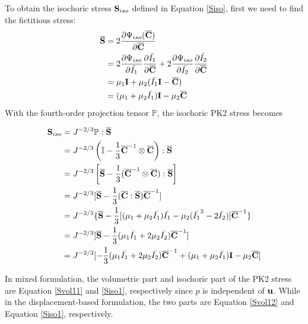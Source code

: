 To obtain the isochoric stress $\bold{S}_{iso}$ defined in Equation \ref{Siso}, first we need to find the fictitious stress:
\begin{equation} \label{Sbar1}
\begin{split}
\overline{\bold{S}} &= 2\frac{\partial\Psi_{iso}({\overline{\bold{C}})}}{\partial\overline{\bold{C}}} \\
&= 2\frac{\partial\Psi_{iso}}{\partial\bar{I_1}} \frac{\partial\bar{I_1}}{\partial\overline{\bold{C}}}  + 2\frac{\partial\Psi_{iso}}{\partial\bar{I_2}} \frac{\partial\bar{I_2}}{\partial\overline{\bold{C}}} \\
&= \mu_1{\bold{I}} + \mu_2({\bar{I_1}\bold{I} - \overline{\bold{C}}}) \\
&= (\mu_1+\mu_2\bar{I_1})\bold{I} - \mu_2{\overline{\bold{C}}}
\end{split}
\end{equation}
With the fourth-order projection tensor $\mathbb{P}$, the isochoric PK2 stress becomes

\begin{equation} \label{Siso1}
\begin{split}
\bold{S}_{iso}
&= J^{-2/3}\mathbb{P}:\overline{\bold{S}} \\
&= J^{-2/3}\left( \mathbb{I} - \frac{1}{3}{\overline{\bold{C}}}^{-1} \otimes \overline{\bold{C}} \right) : \overline{\bold{S}} \\
&= J^{-2/3} \left[\overline{\bold{S}} - \frac{1}{3}( \overline{\bold{C}}^{-1} \otimes \overline{\bold{C}} ) : \overline{\bold{S}} \right]  \\
&= J^{-2/3}[ \overline{\bold{S}} - \frac{1}{3}(\overline{\bold{C}} : \overline{\bold{S}})\overline{\bold{C}}^{-1} ]  \\
&= J^{-2/3}\{ \overline{\bold{S}} - \frac{1}{3} [(\mu_1+\mu_2\bar{I_1})\bar{I_1} - \mu_2(\bar{I_1}^2-2\bar{I_2})]\overline{\bold{C}}^{-1} \} \\
&= J^{-2/3}[\overline{\bold{S}} -  \frac{1}{3}(\mu_1\bar{I_1} + 2\mu_2\bar{I_2}) \overline{\bold{C}}^{-1}] \\
&= J^{-2/3} [    - \frac{1}{3}(\mu_1\bar{I_1} + 2\mu_2\bar{I_2}) \overline{\bold{C}}^{-1}  + (\mu_1 + \mu_2\bar{I_1})\bold{I} - \mu_2\overline{\bold{C}} ]
\end{split}
\end{equation}

In mixed formulation, the volumetric part and isochoric part of the PK2 stress are Equation \ref{Svol11} and \ref{Siso1}, respectively since $p$ is independent of $\bold{u}$. While in the displacement-based formulation, the two parts are Equation \ref{Svol12} and Equation \ref{Siso1}, respectively.

